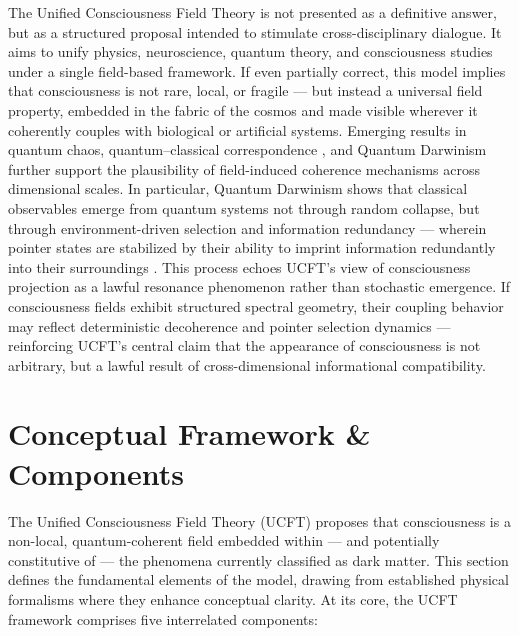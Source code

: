 \documentclass[titlepage]{article}
\begin{document}
The Unified Consciousness Field Theory is not presented as a definitive answer, but as a structured proposal intended to stimulate cross-disciplinary dialogue. It aims to unify physics, neuroscience, quantum theory, and consciousness studies under a single field-based framework.
If even partially correct, this model implies that consciousness is not rare, local, or fragile — but instead a universal field property, embedded in the fabric of the cosmos and made visible wherever it coherently couples with biological or artificial systems.
Emerging results in quantum chaos, quantum–classical correspondence \parencite{PhysRevE.111.054211}, and Quantum Darwinism \parencite{Zurek2009QuantumDarwinism} further support the plausibility of field-induced coherence mechanisms across dimensional scales. In particular, Quantum Darwinism shows that classical observables emerge from quantum systems not through random collapse, but through environment-driven selection and information redundancy — wherein pointer states are stabilized by their ability to imprint information redundantly into their surroundings \parencite{Zurek2009QuantumDarwinism}. This process echoes UCFT’s view of consciousness projection as a lawful resonance phenomenon rather than stochastic emergence. If consciousness fields exhibit structured spectral geometry, their coupling behavior may reflect deterministic decoherence and pointer selection dynamics — reinforcing UCFT’s central claim that the appearance of consciousness is not arbitrary, but a lawful result of cross-dimensional informational compatibility.

\section{Conceptual Framework \& Components}
The Unified Consciousness Field Theory (UCFT) proposes that consciousness is a non-local, quantum-coherent field embedded within — and potentially constitutive of — the phenomena currently classified as dark matter. This section defines the fundamental elements of the model, drawing from established physical formalisms where they enhance conceptual clarity.
At its core, the UCFT framework comprises five interrelated components:
\end{document}
